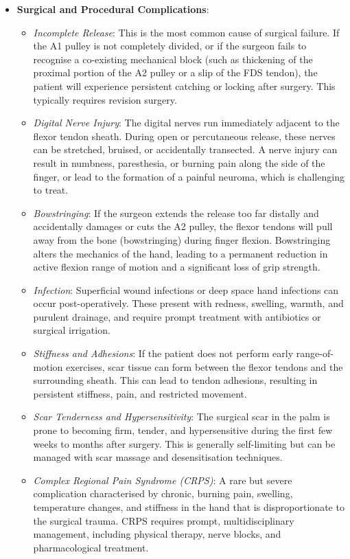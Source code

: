 \begin{itemize}
  \item \textbf{Surgical and Procedural Complications}:
  \begin{itemize}
    \item \textit{Incomplete Release}: This is the most common cause of surgical failure. If the A1 pulley is not completely divided, or if the surgeon fails to recognise a co-existing mechanical block (such as thickening of the proximal portion of the A2 pulley or a slip of the FDS tendon), the patient will experience persistent catching or locking after surgery. This typically requires revision surgery.
    \item \textit{Digital Nerve Injury}: The digital nerves run immediately adjacent to the flexor tendon sheath. During open or percutaneous release, these nerves can be stretched, bruised, or accidentally transected. A nerve injury can result in numbness, paresthesia, or burning pain along the side of the finger, or lead to the formation of a painful neuroma, which is challenging to treat.
    \item \textit{Bowstringing}: If the surgeon extends the release too far distally and accidentally damages or cuts the A2 pulley, the flexor tendons will pull away from the bone (bowstringing) during finger flexion. Bowstringing alters the mechanics of the hand, leading to a permanent reduction in active flexion range of motion and a significant loss of grip strength.
    \item \textit{Infection}: Superficial wound infections or deep space hand infections can occur post-operatively. These present with redness, swelling, warmth, and purulent drainage, and require prompt treatment with antibiotics or surgical irrigation.
    \item \textit{Stiffness and Adhesions}: If the patient does not perform early range-of-motion exercises, scar tissue can form between the flexor tendons and the surrounding sheath. This can lead to tendon adhesions, resulting in persistent stiffness, pain, and restricted movement.
    \item \textit{Scar Tenderness and Hypersensitivity}: The surgical scar in the palm is prone to becoming firm, tender, and hypersensitive during the first few weeks to months after surgery. This is generally self-limiting but can be managed with scar massage and desensitisation techniques.
    \item \textit{Complex Regional Pain Syndrome (CRPS)}: A rare but severe complication characterised by chronic, burning pain, swelling, temperature changes, and stiffness in the hand that is disproportionate to the surgical trauma. CRPS requires prompt, multidisciplinary management, including physical therapy, nerve blocks, and pharmacological treatment.

\end{itemize}
\end{itemize}

